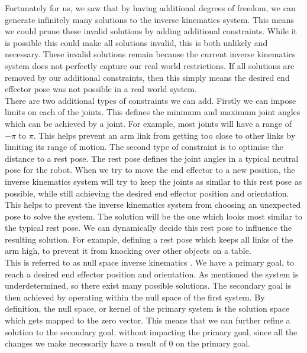 Fortunately for us, we saw that by having additional degrees of freedom, we can generate infinitely many solutions to the inverse kinematics system. This means we could prune these invalid solutions by adding additional constraints. While it is possible this could make all solutions invalid, this is both unlikely and necessary. These invalid solutions remain because the current inverse kinematics system does not perfectly capture our real world restrictions. If all solutions are removed by our additional constraints, then this simply means the desired end effector pose was not possible in a real world system.\\

There are two additional types of constraints we can add. Firstly we can impose limits on each of the joints. This defines the minimum and maximum joint angles which can be achieved by a joint. For example, most joints will have a range of $-\pi$ to $\pi$. This helps prevent an arm link from getting too close to other links by limiting its range of motion. The second type of constraint is to optimise the distance to a rest pose. The rest pose defines the joint angles in a typical neutral pose for the robot. When we try to move the end effector to a new position, the inverse kinematics system will try to keep the joints as similar to this rest pose as possible, while still achieving the desired end effector position and orientation. This helps to prevent the inverse kinematics system from choosing an unexpected pose to solve the system. The solution will be the one which looks most similar to the typical rest pose. We can dynamically decide this rest pose to influence the resulting solution. For example, defining a rest pose which keeps all links of the arm high, to prevent it from knocking over other objects on a table.\\

This is referred to as null space inverse kinematics \cite{null-space}. We have a primary goal, to reach a desired end effector position and orientation. As mentioned the system is underdetermined, so there exist many possible solutions. The secondary goal is then achieved by operating within the null space of the first system. By definition, the null space, or kernel of the primary system is the solution space which gets mapped to the zero vector. This means that we can further refine a solution to the secondary goal, without impacting the primary goal, since all the changes we make necessarily have a result of 0 on the primary goal.


